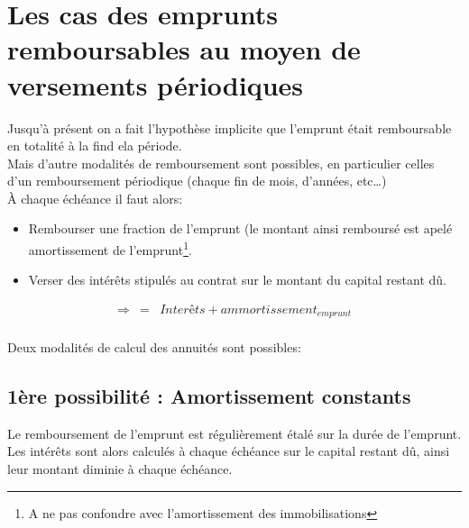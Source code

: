 	\section{Les cas des emprunts remboursables au moyen de versements périodiques}
	Jusqu'à présent on a fait l'hypothèse implicite que l'emprunt était remboursable en totalité à la find ela période.\\
	Mais d'autre modalités de remboursement sont possibles, en particulier celles d'un remboursement périodique (chaque fin de mois, d'années, etc\dots)\\
	À chaque échéance il faut alors:
	\begin{itemize}
		\item Rembourser une fraction de l'emprunt (le montant ainsi remboursé est apelé amortissement de l'emprunt\footnote{A ne pas confondre avec l'amortissement des immobilisations}.
		\item Verser des intérêts stipulés au contrat sur le montant du capital restant dû.
	\end{itemize}
	\begin{eqnarray*}
		\Rightarrow &=& Interêts+ammortissement_{emprunt}
	\end{eqnarray*}
	\paragraph{}Deux modalités de calcul des annuités sont possibles:

	\subsection{1ère possibilité : Amortissement constants}
	Le remboursement de l'emprunt est régulièrement étalé sur la durée de l'emprunt. Les intérêts sont alors calculés à chaque échéance sur le capital restant dû, ainsi leur montant diminie à chaque échéance.
